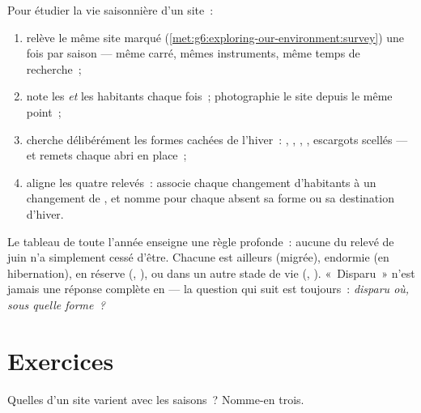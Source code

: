 \begin{method}\label{met:g6:life-through-seasons:yearsurvey}
Pour étudier la vie saisonnière d'un site~:
\begin{enumerate}
  \item relève le même site marqué
        (\cref{met:g6:exploring-our-environment:survey}) une fois
        par saison --- même carré, mêmes instruments, même temps de
        recherche~;
  \item note les  \emph{et} les habitants chaque fois~;
        photographie le site depuis le même point~;
  \item cherche délibérément les formes cachées de l'hiver~:
        , , , , escargots scellés ---
        et remets chaque abri en place~;
  \item aligne les quatre relevés~: associe chaque changement
        d'habitants à un changement de , et nomme pour
        chaque absent sa forme ou sa destination d'hiver.
\end{enumerate}
\end{method}

\begin{remark}\label{rem:g6:life-through-seasons:vanish}
Le tableau de toute l'année enseigne une règle profonde~: aucune
 du relevé de juin n'a simplement cessé d'être. Chacune est
ailleurs (migrée), endormie (en hibernation), en réserve (,
), ou dans un autre stade de vie (, ).
«~Disparu~» n'est jamais une réponse complète en  --- la
question qui suit est toujours~: \emph{disparu où, sous quelle
forme~?}
\end{remark}

\section{Exercices}

\begin{exercise}[$\star$]\label{exo:g6:life-through-seasons:1}
Quelles  d'un site varient avec les saisons~? Nomme-en
trois.
\end{exercise}

